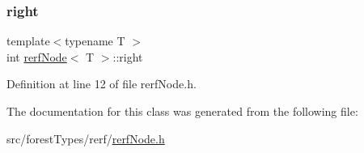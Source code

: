 \subsubsection{\texorpdfstring{right}{right}}
{\footnotesize\ttfamily template$<$typename T $>$ \\
int \hyperlink{classrerfNode}{rerf\+Node}$<$ T $>$\+::right\hspace{0.3cm}{\ttfamily [protected]}}



Definition at line 12 of file rerf\+Node.\+h.



The documentation for this class was generated from the following file\+:\begin{DoxyCompactItemize}
\item 
src/forest\+Types/rerf/\hyperlink{rerfNode_8h}{rerf\+Node.\+h}\end{DoxyCompactItemize}
